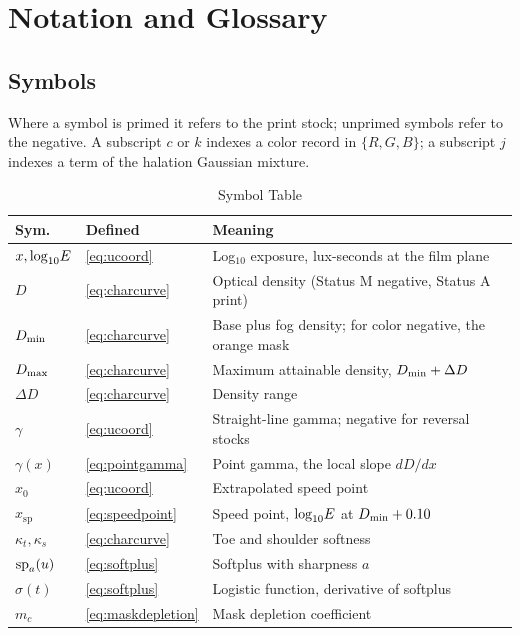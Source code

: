\section{Notation and Glossary}
\label{app:glossary}

\subsection{Symbols}

Where a symbol is primed it refers to the print stock; unprimed symbols refer
to the negative. A subscript $c$ or $k$ indexes a color record in
$\{R, G, B\}$; a subscript $j$ indexes a term of the halation Gaussian mixture.

\begin{table}[htbp]
\caption{Symbol Table}
\label{tab:symbols}
\begin{center}
\renewcommand{\arraystretch}{1.18}
\footnotesize
\begin{tabularx}{\columnwidth}{@{}ll>{\raggedright\arraybackslash}X@{}}
\toprule
\textbf{Sym.} & \textbf{Defined} & \textbf{Meaning} \\
\midrule
$x, \log_{10}\!E$ & \eqref{eq:ucoord} & Log$_{10}$ exposure, lux-seconds at the film plane \\
$D$ & \eqref{eq:charcurve} & Optical density (Status M negative, Status A print) \\
$D_{\min}$ & \eqref{eq:charcurve} & Base plus fog density; for color negative, the orange mask \\
$D_{\max}$ & \eqref{eq:charcurve} & Maximum attainable density, $D_{\min} + \Delta D$ \\
$\Delta D$ & \eqref{eq:charcurve} & Density range \\
$\gamma$ & \eqref{eq:ucoord} & Straight-line gamma; negative for reversal stocks \\
$\gamma(x)$ & \eqref{eq:pointgamma} & Point gamma, the local slope $dD/dx$ \\
$x_0$ & \eqref{eq:ucoord} & Extrapolated speed point \\
$x_{\mathrm{sp}}$ & \eqref{eq:speedpoint} & Speed point, $\log_{10}\!E$ at $D_{\min} + 0.10$ \\
$\kappa_t, \kappa_s$ & \eqref{eq:charcurve} & Toe and shoulder softness \\
$\mathrm{sp}_{a}\!\left(u\right)$ & \eqref{eq:softplus} & Softplus with sharpness $a$ \\
$\sigma(t)$ & \eqref{eq:softplus} & Logistic function, derivative of softplus \\
$m_c$ & \eqref{eq:maskdepletion} & Mask depletion coefficient \\

\end{tabularx}
\end{center}
\end{table}
